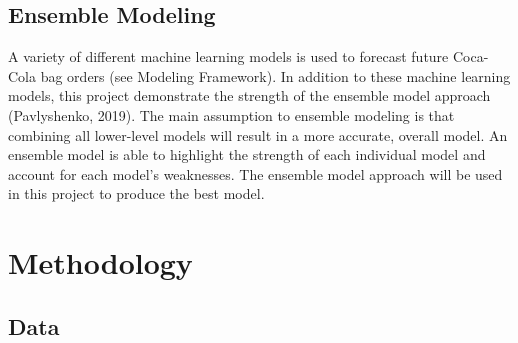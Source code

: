 \documentclass[12pt,oneside]{chicagocapstone}
\begin{document}
\hypertarget{ensemble-modeling}{%
\section*{Ensemble Modeling}\label{ensemble-modeling}}

A variety of different machine learning models is used to forecast future Coca-Cola bag orders (see Modeling Framework). In addition to these machine learning models, this project demonstrate the strength of the ensemble model approach (Pavlyshenko, 2019). The main assumption to ensemble modeling is that combining all lower-level models will result in a more accurate, overall model. An ensemble model is able to highlight the strength of each individual model and account for each model's weaknesses. The ensemble model approach will be used in this project to produce the best model.

\newpage

\hypertarget{methodology}{%
\chapter*{Methodology}\label{methodology}}

\hypertarget{data}{%
\section*{Data}\label{data}}
\end{document}
